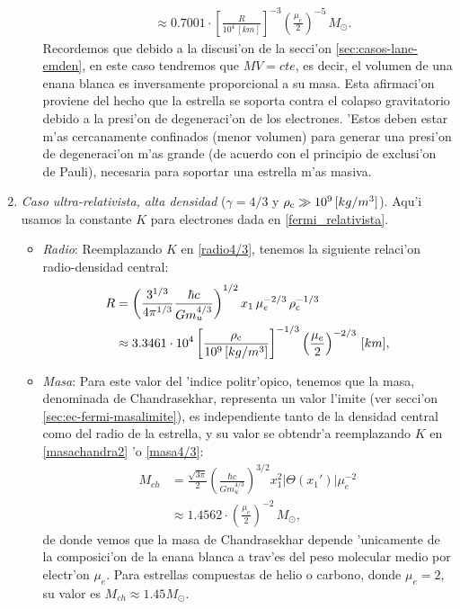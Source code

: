 \begin{enumerate}
\begin{itemize}
\begin{align}
&\approx0.7001\cdot\left[\frac{R}{10^{4}\,[km]}\right]^{-3}\left(\frac{\mu_e}{2}\right)^{-5}\,M_{\odot}.
\end{align}
Recordemos que debido a la discusi'on de la secci'on \eqref{sec:casos-lane-emden}, en este caso tendremos que $MV=cte$, es decir, el volumen de una enana blanca es inversamente proporcional a su masa. Esta afirmaci'on proviene del hecho que la estrella se soporta contra el colapso gravitatorio debido a la presi'on de degeneraci'on de los electrones. 'Estos deben estar m'as cercanamente confinados (menor volumen) para generar una presi'on de degeneraci'on m'as grande (de acuerdo con el principio de exclusi'on de Pauli), necesaria para soportar una estrella m'as masiva.
\end{itemize}

 \item \emph{Caso ultra-relativista, alta densidad} ($\gamma=4/3$ y $\rho_{\rm c}\gg10^{9}\,[kg/m^3]$). Aqu'i usamos la constante $K$ para electrones dada en \eqref{fermi_relativista}.
\begin{itemize}
 \item \emph{Radio}: Reemplazando $K$ en \eqref{radio4/3}, tenemos la siguiente relaci'on radio-densidad central:
\begin{align}
R&=\left(\frac{3^{1/3}}{4\pi^{1/3}}\frac{\hbar c}{Gm_u^{4/3}}\right)^{1/2}x_1\,\mu_e^{-2/3}\,\rho_{\rm c}^{-1/3}\\
 &\approx3.3461\cdot10^{4}\left[\frac{\rho_{\rm c}}{10^{9}\,[kg/m^3]}\right]^{-1/3}\left(\frac{\mu_e}{2}\right)^{-2/3}\,[km],
\end{align}
\item \emph{Masa}: Para este valor del 'indice politr'opico, tenemos que la masa, denominada de Chandrasekhar, representa un valor l'imite (ver secci'on \eqref{sec:ec-fermi-masalimite}), es independiente tanto de la densidad central como del radio de la estrella, y su valor se obtendr'a reemplazando $K$ en \eqref{masachandra2} 'o \eqref{masa4/3}:
\begin{align}\label{masachandra}
M_{ch}&=\frac{\sqrt{3\pi}}{2}\left(\frac{\hbar c}{Gm_u^{4/3}}\right)^{3/2}x_1^2\left|\Theta(x_1')\right|\mu_e^{-2}\\
 &\approx1.4562\cdot\left(\frac{\mu_e}{2}\right)^{-2}\,M_{\odot},\label{enanablanca4/3-masa}
\end{align}
de donde vemos que la masa de Chandrasekhar depende 'unicamente de la composici'on de la enana blanca a trav'es del peso molecular medio por electr'on $\mu_e$. Para estrellas compuestas de helio o carbono, donde $\mu_e=2$, su valor es $M_{ch}\approx1.45M_{\odot}$.
\end{itemize}


\end{enumerate}
